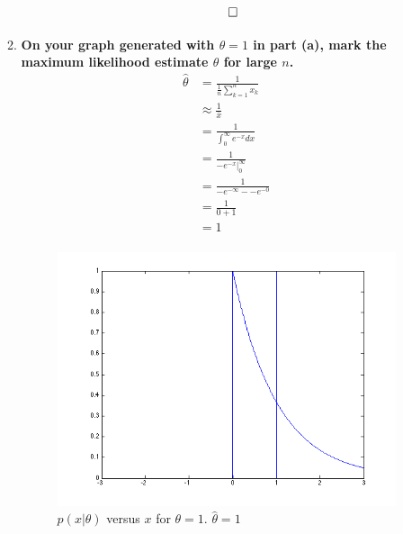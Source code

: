 \documentclass[12pt]{article}
\begin{document}
\begin{enumerate}
\begin{enumerate}
\begin{equation}
\begin{split}
      & \qed
    \end{split}
    \end{equation}
  \item \textbf{On your graph generated with $\theta = 1$ in part (a), mark the maximum likelihood estimate $\hat{\theta}$ for large $n$.}
    \begin{equation}
    \begin{split}
      \hat{\theta}& = \frac{1}{\frac{1}{n}\sum_{k=1}^nx_k} \\
      & \approx \frac{1}{\bar{x}} \\
      & = \frac{1}{\int_0^\infty e^{-x} dx} \\
      & = \frac{1}{-e^{-x}|_0^\infty} \\
      & = \frac{1}{-e^{-\infty} - -e^{-0}} \\
      & = \frac{1}{0 + 1} \\
      & = 1 \\
    \end{split}
    \end{equation}
    \begin{figure}[H]
      \centering
      \includegraphics[width=4in]{1c}
      \caption{$p(x|\theta)$ versus $x$ for $\theta = 1$. $\hat{\theta} = 1$}
    \end{figure}
  \end{enumerate}
\end{enumerate}
\end{document}
